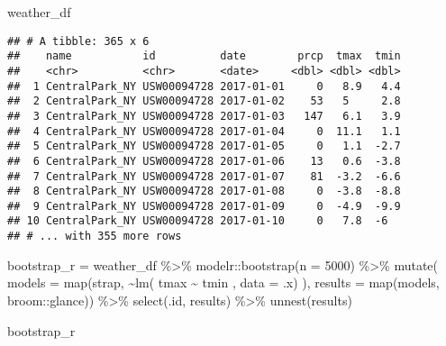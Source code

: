 \documentclass[
]{article}
\newenvironment{Shaded}{\begin{snugshade}}{\end{snugshade}}
\newcommand{\AttributeTok}[1]{\textcolor[rgb]{0.77,0.63,0.00}{#1}}
\newcommand{\DecValTok}[1]{\textcolor[rgb]{0.00,0.00,0.81}{#1}}
\newcommand{\FunctionTok}[1]{\textcolor[rgb]{0.00,0.00,0.00}{#1}}
\newcommand{\NormalTok}[1]{#1}
\newcommand{\OtherTok}[1]{\textcolor[rgb]{0.56,0.35,0.01}{#1}}
\newcommand{\SpecialCharTok}[1]{\textcolor[rgb]{0.00,0.00,0.00}{#1}}
\begin{document}
\begin{Shaded}
\begin{Highlighting}[]
\NormalTok{weather\_df }
\end{Highlighting}
\end{Shaded}

\begin{verbatim}
## # A tibble: 365 x 6
##    name           id          date        prcp  tmax  tmin
##    <chr>          <chr>       <date>     <dbl> <dbl> <dbl>
##  1 CentralPark_NY USW00094728 2017-01-01     0   8.9   4.4
##  2 CentralPark_NY USW00094728 2017-01-02    53   5     2.8
##  3 CentralPark_NY USW00094728 2017-01-03   147   6.1   3.9
##  4 CentralPark_NY USW00094728 2017-01-04     0  11.1   1.1
##  5 CentralPark_NY USW00094728 2017-01-05     0   1.1  -2.7
##  6 CentralPark_NY USW00094728 2017-01-06    13   0.6  -3.8
##  7 CentralPark_NY USW00094728 2017-01-07    81  -3.2  -6.6
##  8 CentralPark_NY USW00094728 2017-01-08     0  -3.8  -8.8
##  9 CentralPark_NY USW00094728 2017-01-09     0  -4.9  -9.9
## 10 CentralPark_NY USW00094728 2017-01-10     0   7.8  -6  
## # ... with 355 more rows
\end{verbatim}

\begin{Shaded}
\begin{Highlighting}[]
\NormalTok{bootstrap\_r }\OtherTok{=}
\NormalTok{  weather\_df }\SpecialCharTok{\%\textgreater{}\%} 
\NormalTok{  modelr}\SpecialCharTok{::}\FunctionTok{bootstrap}\NormalTok{(}\AttributeTok{n =} \DecValTok{5000}\NormalTok{) }\SpecialCharTok{\%\textgreater{}\%} 
  \FunctionTok{mutate}\NormalTok{(}
    \AttributeTok{models =} \FunctionTok{map}\NormalTok{(strap, }\SpecialCharTok{\textasciitilde{}}\FunctionTok{lm}\NormalTok{( tmax }\SpecialCharTok{\textasciitilde{}}\NormalTok{ tmin , }\AttributeTok{data =}\NormalTok{ .x) ),}
    \AttributeTok{results =} \FunctionTok{map}\NormalTok{(models, broom}\SpecialCharTok{::}\NormalTok{glance)) }\SpecialCharTok{\%\textgreater{}\%} 
  \FunctionTok{select}\NormalTok{(.id, results) }\SpecialCharTok{\%\textgreater{}\%} 
  \FunctionTok{unnest}\NormalTok{(results)}

\NormalTok{bootstrap\_r}
\end{Highlighting}
\end{Shaded}
\end{document}
